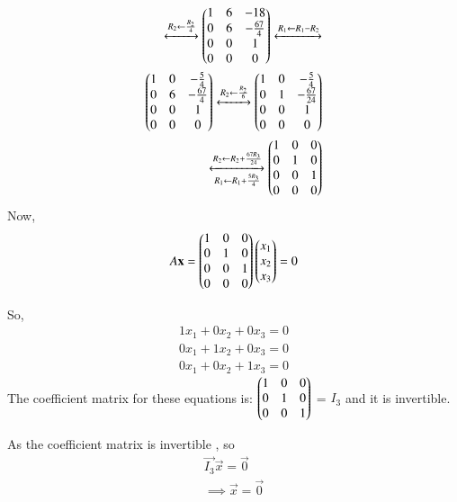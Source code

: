 \documentclass[journal,12pt,twocolumn]{IEEEtran}
\renewcommand\thesection{\arabic{section}}
\begin{document}
\begin{align}
\xleftrightarrow[]{R_2\leftarrow \frac{R_2}{4}}
\begin{pmatrix}1 & 6 & -18\\0 & 6 & -\frac{67}{4}\\0 & 0 & 1\\0 & 0 & 0\end{pmatrix}\xleftrightarrow[]{R_1\leftarrow R_1-R_2}\\
\begin{pmatrix}1 & 0 & -\frac{5}{4}\\0 & 6 & -\frac{67}{4}\\0 & 0 & 1\\0 & 0 & 0\end{pmatrix}\xleftrightarrow[]{R_2\leftarrow \frac{R_2}{6}}
\begin{pmatrix}1 & 0 & -\frac{5}{4}\\0 & 1 & -\frac{67}{24}\\0 & 0 & 1\\0 & 0 & 0\end{pmatrix}\\
\xleftrightarrow[R_1\leftarrow R_1+\frac{5R_3}{4}]{R_2\leftarrow R_2+\frac{67R_3}{24}}
\begin{pmatrix}1 & 0 & 0\\0 & 1 & 0\\0 & 0 & 1\\0 & 0 & 0\end{pmatrix}
\end{align}
Now,
\begin{align}
A\mathbf{x} = \begin{pmatrix}1 & 0 & 0\\0 & 1 & 0\\0 & 0 & 1\\0 & 0 & 0\end{pmatrix}\begin{pmatrix}x_1\\x_2\\x_3\end{pmatrix} = 0
\end{align}


So,
\begin{align}
1 x_1 + 0 x_2 + 0 x_3 = 0\\
0 x_1 + 1 x_2 + 0 x_3 = 0\\
0 x_1 + 0 x_2 + 1 x_3 = 0
\end{align}
The coefficient matrix for these equations is: $\begin{pmatrix}1 & 0 & 0\\0 & 1 & 0\\0 & 0 & 1\end{pmatrix}$ = $I_3$ and it is invertible.

As the coefficient matrix is invertible , so
\begin{align}
\vec{I_3} \vec{x} = \vec{0}\\
\implies \vec{x}= \vec{0}
\end{align} 
\end{document}
